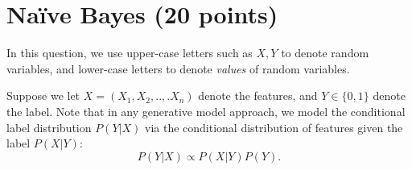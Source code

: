 \documentclass{article}
\begin{document}
\newpage

\section{Na\"ive Bayes (20 points)}
In this question, we use upper-case letters such as $X, Y$ to denote random variables, and lower-case letters to denote \emph{values} of random variables.

Suppose we let $X=(X_1,X_2,..,.X_n)$ denote the features, and $Y\in \{0, 1\}$ denote the label. Note that in any generative model approach, we model the conditional label distribution $P(Y|X)$ via the conditional distribution of features given the label $P(X|Y)$:
\begin{equation}\label{eqn:pxy}
P(Y|X)\propto P(X|Y)P(Y).
\end{equation}
\end{document}
